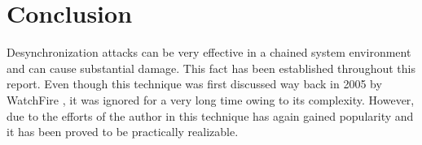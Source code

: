 \chapter{Conclusion}
Desynchronization attacks can be very effective in a chained system environment and can cause substantial damage. This fact has been established throughout this report. Even though this technique was first discussed way back in 2005 by WatchFire \cite{b5}, it was ignored for a very long time owing to its complexity. However, due to the efforts of the author in \cite{b6} this technique has again gained popularity and it has been proved to be practically realizable. 